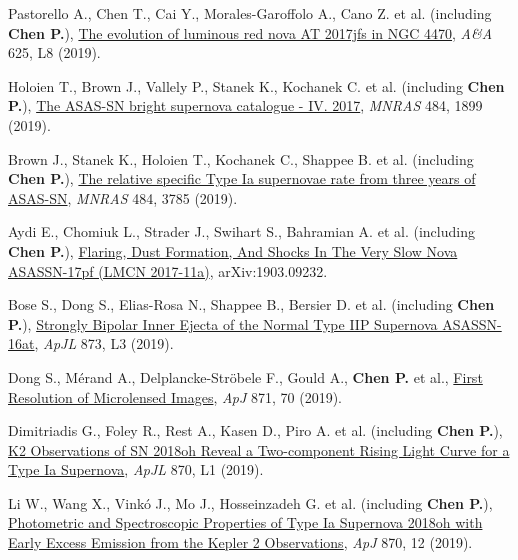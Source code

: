 \item Pastorello A., Chen T., Cai Y., Morales-Garoffolo A., Cano Z. et al. (including \textbf{Chen P.}), \href{https://ui.adsabs.harvard.edu/abs/2019A&A...625L...8P}{The evolution of luminous red nova AT 2017jfs in NGC 4470}, \textit{A\&A} 625, L8 (2019).

\item Holoien T., Brown J., Vallely P., Stanek K., Kochanek C. et al. (including \textbf{Chen P.}), \href{https://ui.adsabs.harvard.edu/abs/2019MNRAS.484.1899H}{The ASAS-SN bright supernova catalogue - IV. 2017}, \textit{MNRAS} 484, 1899 (2019).

\item Brown J., Stanek K., Holoien T., Kochanek C., Shappee B. et al. (including \textbf{Chen P.}), \href{https://ui.adsabs.harvard.edu/abs/2019MNRAS.484.3785B}{The relative specific Type Ia supernovae rate from three years of ASAS-SN}, \textit{MNRAS} 484, 3785 (2019).

\item Aydi E., Chomiuk L., Strader J., Swihart S., Bahramian A. et al. (including \textbf{Chen P.}), \href{https://ui.adsabs.harvard.edu/abs/2019arXiv190309232A}{Flaring, Dust Formation, And Shocks In The Very Slow Nova ASASSN-17pf (LMCN 2017-11a)}, arXiv:1903.09232.

\item Bose S., Dong S., Elias-Rosa N., Shappee B., Bersier D. et al. (including \textbf{Chen P.}), \href{https://ui.adsabs.harvard.edu/abs/2019ApJ...873L...3B}{Strongly Bipolar Inner Ejecta of the Normal Type IIP Supernova ASASSN-16at}, \textit{ApJL} 873, L3 (2019).

\item Dong S., M{\'e}rand A., Delplancke-Str{\"o}bele F., Gould A., \textbf{Chen P.} et al., \href{https://ui.adsabs.harvard.edu/abs/2019ApJ...871...70D}{First Resolution of Microlensed Images}, \textit{ApJ} 871, 70 (2019).

\item Dimitriadis G., Foley R., Rest A., Kasen D., Piro A. et al. (including \textbf{Chen P.}), \href{https://ui.adsabs.harvard.edu/abs/2019ApJ...870L...1D}{K2 Observations of SN 2018oh Reveal a Two-component Rising Light Curve for a Type Ia Supernova}, \textit{ApJL} 870, L1 (2019).

\item Li W., Wang X., Vink{\'o} J., Mo J., Hosseinzadeh G. et al. (including \textbf{Chen P.}), \href{https://ui.adsabs.harvard.edu/abs/2019ApJ...870...12L}{Photometric and Spectroscopic Properties of Type Ia Supernova 2018oh with Early Excess Emission from the Kepler 2 Observations}, \textit{ApJ} 870, 12 (2019).

